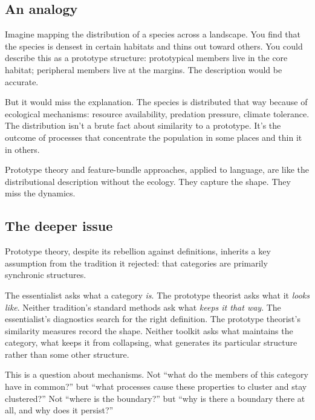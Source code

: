 \subsection{An analogy}
\label{sec:1:analogy}

Imagine mapping the distribution of a species across a landscape. You find that the species is densest in certain habitats and thins out toward others. You could describe this as a prototype structure: prototypical members live in the core habitat; peripheral members live at the margins. The description would be accurate.

But it would miss the explanation. The species is distributed that way because of ecological mechanisms: resource availability, predation pressure, climate tolerance. The distribution isn't a brute fact about similarity to a prototype. It's the outcome of processes that concentrate the population in some places and thin it in others.

Prototype theory and feature-bundle approaches, applied to language, are like the distributional description without the ecology. They capture the shape. They miss the dynamics.

\subsection{The deeper issue}
\label{sec:1:deeper-issue}

Prototype theory, despite its rebellion against definitions, inherits a key assumption from the tradition it rejected: that categories are primarily synchronic structures.

The essentialist asks what a category \emph{is}. The prototype theorist asks what it \emph{looks like}. Neither tradition's standard methods ask what \emph{keeps it that way}. The essentialist's diagnostics search for the right definition. The prototype theorist's similarity measures record the shape. Neither toolkit asks what maintains the category, what keeps it from collapsing, what generates its particular structure rather than some other structure.

This is a question about mechanisms. Not \enquote{what do the members of this category have in common?} but \enquote{what processes cause these properties to cluster and stay clustered?} Not \enquote{where is the boundary?} but \enquote{why is there a boundary there at all, and why does it persist?}

